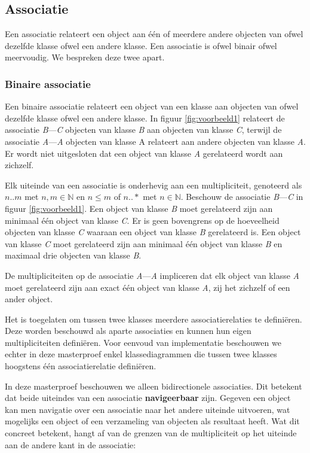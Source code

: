 \subsection{Associatie}

Een associatie relateert een object aan \'e\'en of meerdere andere objecten van ofwel dezelfde klasse ofwel een andere klasse. Een associatie is ofwel binair ofwel meervoudig. We bespreken deze twee apart.

\subsubsection{Binaire associatie}\label{sec:bin-assoc}

Een binaire associatie relateert een object van een klasse aan objecten van ofwel dezelfde klasse ofwel een andere klasse. In figuur \ref{fig:voorbeeld1} relateert de associatie \textit{B}---\textit{C} objecten van klasse \textit{B} aan objecten van klasse \textit{C}, terwijl de associatie \textit{A}---\textit{A} objecten van klasse A relateert aan andere objecten van klasse \textit{A}. Er wordt niet uitgesloten dat een object van klasse \textit{A} gerelateerd wordt aan zichzelf.

Elk uiteinde van een associatie is onderhevig aan een multipliciteit, genoteerd als $n..m$ met $n,m \in \mathbb{N}$ en $n \leq m$ of $n..*$ met $n \in \mathbb{N}$. Beschouw de associatie \textit{B}---\textit{C} in figuur \ref{fig:voorbeeld1}. Een object van klasse \textit{B} moet gerelateerd zijn aan minimaal \'e\'en object van klasse \textit{C}. Er is geen bovengrens op de hoeveelheid objecten van klasse \textit{C} waaraan een object van klasse \textit{B} gerelateerd is. Een object van klasse \textit{C} moet gerelateerd zijn aan minimaal \'e\'en object van klasse \textit{B} en maximaal drie objecten van klasse \textit{B}.

De multipliciteiten op de associatie \textit{A}---\textit{A} impliceren dat elk object van klasse \textit{A} moet gerelateerd zijn aan exact \'e\'en object van klasse \textit{A}, zij het zichzelf of een ander object.

Het is toegelaten om tussen twee klasses meerdere associatierelaties te defini\"eren. Deze worden beschouwd als aparte associaties en kunnen hun eigen multipliciteiten defini\"eren. Voor eenvoud van implementatie beschouwen we echter in deze masterproef enkel klassediagrammen die tussen twee klasses hoogstens \'e\'en associatierelatie defini\"eren.

In deze masterproef beschouwen we alleen bidirectionele associaties. Dit betekent dat beide uiteindes van een associatie \textbf{navigeerbaar} zijn. Gegeven een object kan men navigatie over een associatie naar het andere uiteinde uitvoeren, wat mogelijks een object of een verzameling van objecten als resultaat heeft. Wat dit concreet betekent, hangt af van de grenzen van de multipliciteit op het uiteinde aan de andere kant in de associatie:


